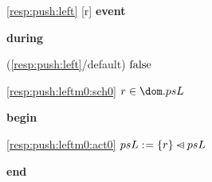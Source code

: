 \noindent \ref{resp:push:left} [r] \textbf{event}
\begin{block}
  \item   \textbf{during}
  \begin{block}
  \item[ (\ref{resp:push:left}/default) ]\sout{$\text{false} $} %
  \end{block}
  \begin{block}
  \item[ \eqref{resp:push:leftm0:sch0} ]{$r \in \dom.psL $} %
  \end{block}
  \item   \textbf{begin}
  \begin{block}
  \item[ \eqref{resp:push:leftm0:act0} ]{$psL \mathrel{:\mkern1mu=} \{r\} \mathbin{\lhd\mkern-14mu-} psL $} %
  \end{block}
  \item   \textbf{end} \\
\end{block}

